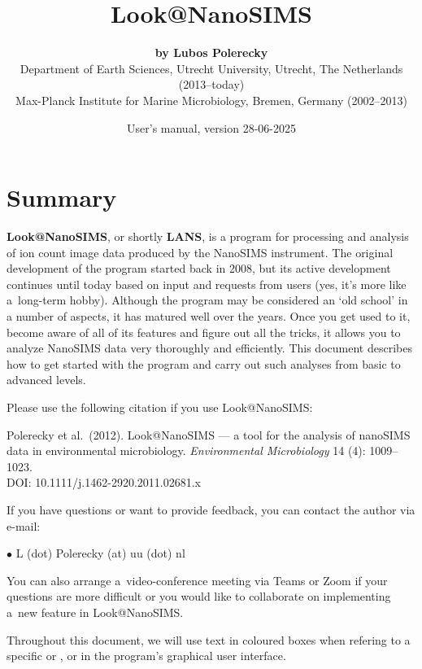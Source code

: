 \documentclass[a4paper, 11pt]{article}
\title{\LARGE \bf Look@NanoSIMS}
\author{{\large\bf by Lubos Polerecky}\\[6mm]
{\small Department of Earth Sciences, Utrecht University, Utrecht, The Netherlands (2013--today)} \\%
{\small Max-Planck Institute for Marine Microbiology, Bremen, Germany (2002--2013)}\\[3mm]}
\date{User's manual, version 28-06-2025}
\newcommand{\ttt}[1]{\textsf{#1}}
\newcommand\bul{\noindent$\bullet${ }}
\begin{document}
\maketitle
\reversemarginpar 

\section*{Summary}
\textbf{Look@NanoSIMS}, or shortly \textbf{LANS}, is a program for processing and analysis of ion count image data produced by the NanoSIMS instrument. The original development of the program started back in 2008, but its active development continues until today based on input and requests from users (yes, it's more like a~long-term hobby). Although the program may be considered an `old school' in a number of aspects, it has matured well over the years. Once you get used to it, become aware of all of its features and figure out all the tricks, it allows you to analyze NanoSIMS data very thoroughly and efficiently. This document describes how to get started with the program and carry out such analyses from basic to advanced levels. 

\vskip6mm

Please use the following citation if you use Look@NanoSIMS:

\textsf{Polerecky et al.~(2012). Look@NanoSIMS --- a tool for the analysis of nanoSIMS data in environmental microbiology. \textit{Environmental Microbiology} 14 (4): 1009--1023.\\
DOI: 10.1111/j.1462-2920.2011.02681.x}
\tcbe

\vskip4mm

If you have questions or want to provide feedback, you can contact the author via e-mail: 

\bul \ttt{L (dot) Polerecky (at) uu (dot) nl}

\vskip1mm\noindent You can also arrange a~video-conference meeting via Teams or Zoom if your questions are more difficult or you would like to collaborate on implementing a~new feature in Look@NanoSIMS.
\tcbe

\vskip4mm

Throughout this document, we will use text in coloured boxes when refering to a specific  or ,  or  in the program's graphical user interface.
\tcbe

\newpage

\tableofcontents
\end{document}

